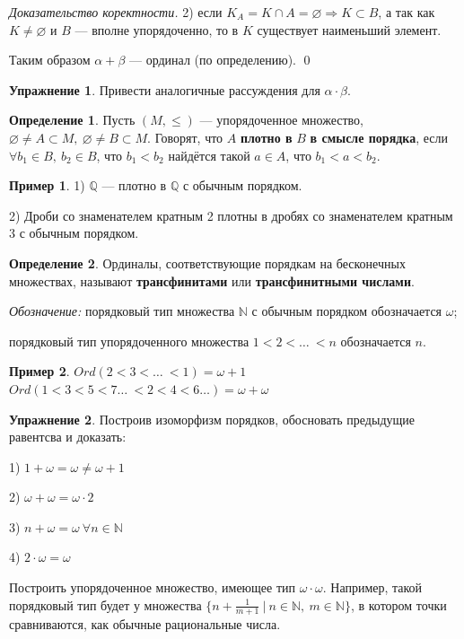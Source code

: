 \documentclass[12pt,oneside]{article}
\theoremstyle{definition}
\newtheorem{definition}{Определение}
\newtheorem{exercise}{Упражнение}
\newtheorem{exmp}{Пример}[section]
\newenvironment{ourproof}[1]{\textit{Доказательство #1.}}{\qed}
\begin{document}
\begin{ourproof}{коректности}
2) если $K_A=K\cap A = \varnothing \Longrightarrow K\subset B$, а так как $K\neq\varnothing$ и $B$ --- вполне упорядоченно, то в $K$ существует наименьший элемент.

Таким образом $\alpha + \beta$ --- ординал (по определению).
\end{ourproof}

\begin{exercise}
Привести аналогичные рассуждения для $\alpha\cdot\beta$.
\end{exercise}

\begin{definition}
Пусть $(M, \leqslant)$ --- упорядоченное множество, $\varnothing \neq A\subset M,\ \varnothing \neq B\subset M$. Говорят, что $A$ \textbf{плотно в} $B$ \textbf{в смысле порядка}, если $\forall b_1\in B,\ b_2\in B$, что $b_1 < b_2$ найдётся такой $a\in A$, что $b_1 < a < b_2$.
\end{definition}
\begin{exmp}
1) $\mathbb{Q}$ --- плотно в $\mathbb{Q}$ с обычным порядком.

2) Дроби со знаменателем кратным 2 плотны в дробях со знаменателем кратным 3 с обычным порядком.
\end{exmp}

\begin{definition}
Ординалы, соответствующие порядкам на бесконечных множествах, называют \textbf{трансфинитами} или \textbf{трансфинитными числами}.

\textit{Обозначение: } порядковый тип множества $\mathbb{N}$ с обычным порядком обозначается $\omega$;

порядковый тип упорядоченного множества $1<2<\dots\ <n$ обозначается $n$.
\end{definition}
\begin{exmp}
$Ord(2<3<\dots\ < 1) = \omega + 1$
\newline
$Ord(1<3<5<7\dots\ < 2<4<6\dots) = \omega + \omega $
\end{exmp}
\begin{exercise}
Построив изоморфизм порядков, обосновать предыдущие равентсва и доказать:

1) $1+\omega = \omega \neq \omega + 1$

2) $\omega + \omega = \omega\cdot 2$

3) $n + \omega = \omega\ \forall n\in\mathbb{N}$

4) $2\cdot \omega = \omega$

Построить упорядоченное множество, имеющее тип $\omega\cdot\omega$. Например, такой порядковый тип будет у множества $\{n+\frac{1}{m+1}\ |\ n\in\mathbb{N},\ m\in\mathbb{N}\}$, в котором точки сравниваются, как обычные рациональные числа.
\end{exercise} 
\end{document}
